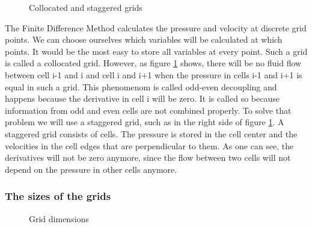 \documentclass{article}
\begin{document}
\begin{figure}[h]
\centering
{} \caption{Collocated and staggered grids} \label{Odd-even decoupling} \end{figure}
The Finite Difference Method calculates the pressure and velocity at discrete grid points. We can choose ourselves which variables will be calculated at which points. It would be the most easy to store all variables at every point. Such a grid is called a collocated grid\cite{Staggered grid}. However, as figure \ref{Odd-even decoupling} shows, there will be no fluid flow between cell i-1 and i and cell i and i+1 when the pressure in cells i-1 and i+1 is equal in such a grid. This phenomenom is called odd-even decoupling and happens because the derivative in cell i will be zero\cite{Staggered grid}. It is called so because information from odd and even cells are not combined properly\cite{Staggered grid}. To solve that problem we will use a staggered grid, such as in the right side of figure \ref{Odd-even decoupling}. A staggered grid consists of cells. The pressure is stored in the cell center and the velocities in the cell edges that are perpendicular to them\cite{Staggered grid}. As one can see, the derivatives will not be zero anymore, since the flow between two cells will not depend on the pressure in other cells anymore.

\subsubsection{The sizes of the grids}
\begin{figure}[h]
\centering
\caption{Grid dimensions}
\end{figure}
\end{document}
